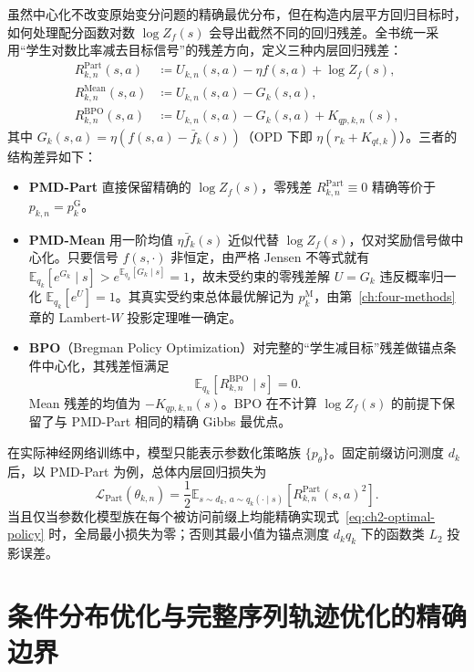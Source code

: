\documentclass[lang=cn,scheme=chinese,openany]{elegantbook}
\newcommand{\E}{\mathbb E}
\begin{document}
虽然中心化不改变原始变分问题的精确最优分布，但在构造内层平方回归目标时，如何处理配分函数对数 $\log Z_f(s)$ 会导出截然不同的回归残差。全书统一采用“学生对数比率减去目标信号”的残差方向，定义三种内层回归残差：
\begin{align}
R^{\mathrm{Part}}_{k,n}(s,a)&\coloneqq U_{k,n}(s,a)-\eta f(s,a)+\log Z_f(s),\label{eq:part-residual}\\
R^{\mathrm{Mean}}_{k,n}(s,a)&\coloneqq U_{k,n}(s,a)-G_k(s,a),\label{eq:mean-residual}\\
R^{\mathrm{BPO}}_{k,n}(s,a)&\coloneqq U_{k,n}(s,a)-G_k(s,a)+K_{qp,k,n}(s),
\end{align}
其中 $G_k(s,a)=\eta(f(s,a)-\bar f_k(s))$（OPD 下即 $\eta(r_k+K_{qt,k})$）。三者的结构差异如下：
\begin{itemize}
\item \textbf{PMD-Part} 直接保留精确的 $\log Z_f(s)$，零残差 $R^{\mathrm{Part}}_{k,n}\equiv 0$ 精确等价于 $p_{k,n}=p_k^{\mathrm G}$。
\item \textbf{PMD-Mean} 用一阶均值 $\eta\bar f_k(s)$ 近似代替 $\log Z_f(s)$，仅对奖励信号做中心化。只要信号 $f(s,\cdot)$ 非恒定，由严格 Jensen 不等式就有 $\mathbb E_{q_k}[e^{G_k}\mid s]>e^{\mathbb E_{q_k}[G_k\mid s]}=1$，故未受约束的零残差解 $U=G_k$ 违反概率归一化 $\mathbb E_{q_k}[e^U]=1$。其真实受约束总体最优解记为 $p_k^{\mathrm M}$，由第~\ref{ch:four-methods} 章的 Lambert-$W$ 投影定理唯一确定。
\item \textbf{BPO}（Bregman Policy Optimization）对完整的“学生减目标”残差做锚点条件中心化，其残差恒满足
\begin{equation*}
\mathbb E_{q_k}[R^{\mathrm{BPO}}_{k,n}\mid s]=0.
\end{equation*}
Mean 残差的均值为 $-K_{qp,k,n}(s)$。BPO 在不计算 $\log Z_f(s)$ 的前提下保留了与 PMD-Part 相同的精确 Gibbs 最优点。
\end{itemize}

在实际神经网络训练中，模型只能表示参数化策略族 $\{p_\theta\}$。固定前缀访问测度 $d_k$ 后，以 PMD-Part 为例，总体内层回归损失为
\begin{equation}\label{eq:part-loss}
 \mathcal L_{\mathrm{Part}}(\theta_{k,n})
 =\frac12\E_{s\sim d_k,\,a\sim q_k(\cdot\mid s)}
 \left[R^{\mathrm{Part}}_{k,n}(s,a)^2\right].
\end{equation}
当且仅当参数化模型族在每个被访问前缀上均能精确实现式~\eqref{eq:ch2-optimal-policy} 时，全局最小损失为零；否则其最小值为锚点测度 $d_k q_k$ 下的函数类 $L_2$ 投影误差。

\section{条件分布优化与完整序列轨迹优化的精确边界}
\label{sec:power-scope}
\end{document}
